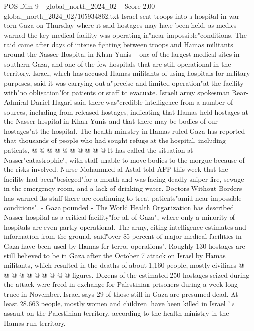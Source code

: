 \begin{textsample}{POS Dim 9 – global\_north\_2024\_02 – Score 2.00 – global\_north\_2024\_02/105934862.txt}  \label{ex:f9_pos_158}
Israel sent troops into a hospital in war-torn Gaza on Thursday where it said hostages may have been held, as medics warned the key medical facility was operating in"near impossible"conditions.
The raid came after days of intense fighting between troops and Hamas militants around the Nasser Hospital in Khan Yunis -- one of the largest medical sites in southern Gaza, and one of the few hospitals that are still operational in the territory.
Israel, which has accused Hamas militants of using hospitals for military purposes, said it was carrying out a"precise and limited operation"at the facility with"no obligation"for patients or staff to evacuate.
Israeli army spokesman Rear-Admiral Daniel Hagari said there was"credible intelligence from a number of sources, including from released hostages, indicating that Hamas held hostages at the Nasser hospital in Khan Yunis and that there may be bodies of our hostages"at the hospital.
The health ministry in Hamas-ruled Gaza has reported that thousands of people who had sought refuge at the hospital, including patients, @ @ @ @ @ @ @ @ @ @ It has called the situation at Nasser"catastrophic", with staff unable to move bodies to the morgue because of the risks involved.
Nurse Mohammed al-Astal told AFP this week that the facility had been"besieged"for a month and was facing deadly sniper fire, sewage in the emergency room, and a lack of drinking water.
Doctors Without Borders has warned its staff there are continuing to treat patients"amid near impossible conditions". - Gaza pounded - The World Health Organization has described Nasser hospital as a critical facility"for all of Gaza", where only a minority of hospitals are even partly operational.
The army, citing intelligence estimates and information from the ground, said"over 85 percent of major medical facilities in Gaza have been used by Hamas for terror operations".
Roughly 130 hostages are still believed to be in Gaza after the October 7 attack on Israel by Hamas militants, which resulted in the deaths of about 1,160 people, mostly civilians @ @ @ @ @ @ @ @ @ @ figures.
Dozens of the estimated 250 hostages seized during the attack were freed in exchange for Palestinian prisoners during a week-long truce in November.
Israel says 29 of those still in Gaza are presumed dead.
At least 28,663 people, mostly women and children, have been killed in Israel ' s assault on the Palestinian territory, according to the health ministry in the Hamas-run territory.

\end{textsample}
